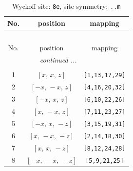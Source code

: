 \documentclass[fleqn,8pt]{jsarticle}
\begin{document}
\begin{longtable}{ccc}
\caption{Wyckoff site: {\tt 8e}, site symmetry: {\tt ..m}}
 \\
 \hline \hline
No. & position & mapping \\ \hline \endfirsthead

\multicolumn{2}{l}{\tablename\ \thetable{}} \\
 \hline \hline
No. & position & mapping \\ \hline \endhead

 \hline \hline
\multicolumn{2}{r}{\footnotesize\it continued ...} \\ \endfoot

 \hline \hline
\multicolumn{2}{r}{} \\ \endlastfoot

1 & $\left[ x,\, x,\, z \right]$ & {\tt [1,13,17,29]} \\ \hline
2 & $\left[ - x,\, - x,\, z \right]$ & {\tt [4,16,20,32]} \\ \hline
3 & $\left[ - x,\, x,\, z \right]$ & {\tt [6,10,22,26]} \\ \hline
4 & $\left[ x,\, - x,\, z \right]$ & {\tt [7,11,23,27]} \\ \hline
5 & $\left[ - x,\, x,\, - z \right]$ & {\tt [3,15,19,31]} \\ \hline
6 & $\left[ x,\, - x,\, - z \right]$ & {\tt [2,14,18,30]} \\ \hline
7 & $\left[ x,\, x,\, - z \right]$ & {\tt [8,12,24,28]} \\ \hline
8 & $\left[ - x,\, - x,\, - z \right]$ & {\tt [5,9,21,25]} \\
\end{longtable}
\renewcommand{\arraystretch}{1.2}
\end{document}
